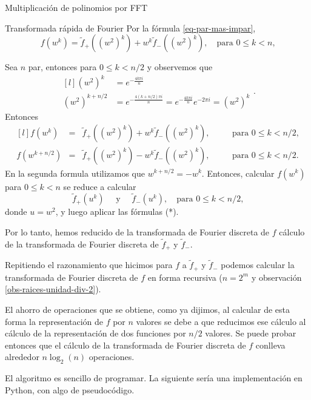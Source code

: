 \begin{chapter}{Multiplicación de polinomios por FFT}
\begin{section}{Transformada rápida de Fourier}
    Por  la fórmula \eqref{eq-par-mas-impar},
    $$
        f(w^k) = \tilde{f}_+((w^2)^k) + w^k \tilde{f}_-((w^2)^k), \quad \text{para $0 \le k < n$,}
    $$

    Sea $n$ par, entonces para $0 \le k <n/2$ y observemos que
    \begin{equation*}
        \begin{matrix*}[l]
            (w^2)^k &= e^{-\frac{4k\pi i}{n}}   \\
            (w^2)^{k+ n/2} &= e^{-\frac{4(k+n/2)\pi i}{n}}= e^{-\frac{4k\pi i}{n}}e^{-2\pi i}= (w^2)^k
        \end{matrix*}.
    \end{equation*}
    Entonces
    \begin{equation*}
        \begin{matrix*}[l]
            f(w^k) &=& \tilde{f}_+((w^2)^k) + w^k \tilde{f}_-((w^2)^k),& \quad &\text{para $0 \le k < n/2$,} \\
            f(w^{k+n/2}) &=& \tilde{f}_+((w^2)^k) - w^{k} \tilde{f}_-((w^2)^k),& \quad &\text{para $0 \le k < n/2$.}
        \end{matrix*} \tag{*}
    \end{equation*}
    En la segunda formula utilizamos que $w^{k + n/2}= -w^k$. Entonces, calcular $f(w^k)$ para $0 \le k < n$ se reduce a calcular
    $$
        \tilde{f}_+(u^k) \quad\text{ y }\quad  \tilde{f}_-(u^k), \quad \text{para $0 \le k < n/2$,}
    $$
    donde $u= w^2$, y  luego  aplicar las fórmulas (*).

    Por lo tanto, hemos reducido de la transformada de Fourier discreta de $f$  cálculo de la transformada de Fourier discreta de $\tilde{f}_+$ y $\tilde{f}_-$.

    Repitiendo el razonamiento  que hicimos para $f$  a  $\tilde{f}_+$ y $\tilde{f}_-$ podemos calcular la transformada de Fourier discreta de $f$ en forma recursiva ($n = 2^m$ y observación \ref{obs-raices-unidad-div-2}).

    El ahorro de operaciones que se obtiene, como ya dijimos, al calcular de esta forma la representación de $f$ por $n$ valores se debe a que reducimos ese cálculo al cálculo de la representación de  dos funciones por $n/2$ valores. Se puede probar entonces que el cálculo de la transformada de Fourier discreta de $f$ conlleva alrededor $n\log_2(n)$ operaciones.

    El algoritmo es sencillo de programar. La siguiente sería una implementación en Python,  con algo de pseudocódigo.


\end{section}
\end{chapter}
